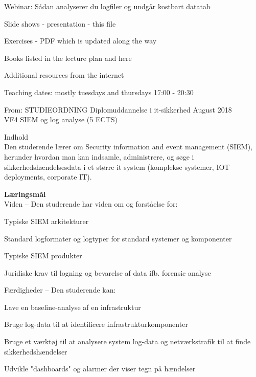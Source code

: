 \documentclass[Screen16to9,17pt]{foils}
\begin{document}
\mytitlepage
{}
{Webinar: Sådan analyserer du logfiler og undgår kostbart datatab}


\hlkprofiluk






\begin{list2}
\item Slide shows - presentation - this file
\item Exercises - PDF which is updated along the way
\item Books listed in the lecture plan and here
\item Additional resources from the internet
\end{list2}

Teaching dates: mostly tuesdays and thursdays 17:00 - 20:30


From: STUDIEORDNING Diplomuddannelse i it-sikkerhed August 2018\\
VF4 SIEM og log analyse (5 ECTS)

Indhold\\
Den studerende lærer om Security information and event management (SIEM), herunder
hvordan man kan indsamle, administrere, og søge i sikkerhedshændelsesdata i et større it
system (komplekse systemer, IOT deployments, corporate IT).

{\bf Læringsmål}\\
Viden -- Den studerende har viden om og forståelse for:
\begin{list2}
\item Typiske SIEM arkitekturer
\item Standard logformater og logtyper for standard systemer og komponenter
\item Typiske SIEM produkter
\item Juridiske krav til logning og bevarelse af data ifb. forensic analyse
\end{list2}

Færdigheder -- Den studerende kan:
\begin{list2}
\item Lave en baseline-analyse af en infrastruktur
\item Bruge log-data til at identificere infrastrukturkomponenter
\item Bruge et værktøj til at analysere system log-data og netværkstrafik til at finde sikkerhedshændelser
\item Udvikle "dashboards" og alarmer der viser tegn på hændelser
\end{list2}
\end{document}
